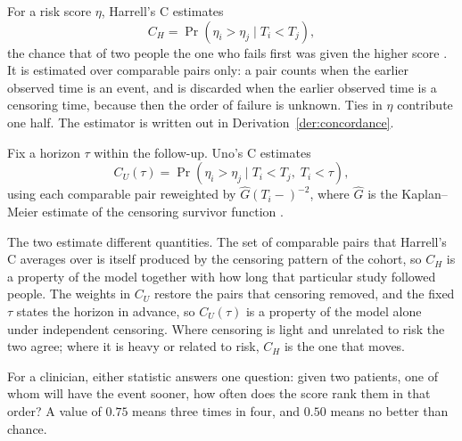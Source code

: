 \begin{definition}
\label{def:prog2:harrellc}
For a risk score $\eta$, Harrell's C estimates
\begin{equation}
  C_H=\Pr(\eta_i>\eta_j\mid T_i<T_j),
  \label{eq:harrellc}
\end{equation}
the chance that of two people the one who fails first was given the higher
score \citep{harrell_1996}. It is estimated over comparable pairs only: a pair
counts when the earlier observed time is an event, and is discarded when the
earlier observed time is a censoring time, because then the order of failure
is unknown. Ties in $\eta$ contribute one half. The estimator is written out in
Derivation~\ref{der:concordance}.
\end{definition}

\begin{definition}
\label{def:prog2:unoc}
Fix a horizon $\tau$ within the follow-up. Uno's C estimates
\begin{equation}
  C_U(\tau)=\Pr(\eta_i>\eta_j\mid T_i<T_j,\;T_i<\tau),
  \label{eq:unoc}
\end{equation}
using each comparable pair reweighted by $\widehat G(T_i-)^{-2}$, where
$\widehat G$ is the Kaplan--Meier estimate of the censoring survivor function
\citep{uno_2011}.

The two estimate different quantities. The set of comparable pairs that
Harrell's C averages over is itself produced by the censoring pattern of the
cohort, so $C_H$ is a property of the model together with how long that
particular study followed people. The weights in $C_U$ restore the pairs that
censoring removed, and the fixed $\tau$ states the horizon in advance, so
$C_U(\tau)$ is a property of the model alone under independent censoring.
Where censoring is light and unrelated to risk the two agree; where it is heavy
or related to risk, $C_H$ is the one that moves.
\end{definition}

\noindent For a clinician, either statistic answers one question: given two patients, one of whom will have the event sooner, how often does the score rank them in that order? A value of $0.75$ means three times in four, and $0.50$ means no better than chance.

